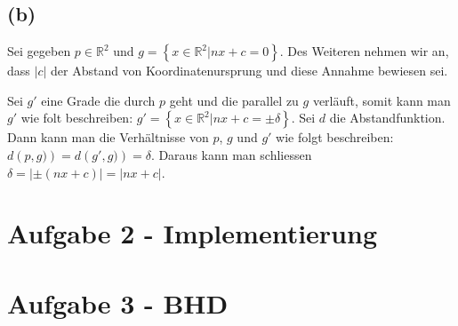 \documentclass[a4paper]{article}
\begin{document}
\subsection*{(b)}

Sei gegeben $p \in \mathbb{R}^2$ und $g = \left\{x \in \mathbb{R}^2| nx + c = 0 \right\}$. Des Weiteren nehmen wir an, dass $|c|$ der Abstand von Koordinatenursprung und diese Annahme bewiesen sei.

Sei $g'$ eine Grade die durch $p$ geht und die parallel zu $g$ verläuft, somit kann man $g'$ wie folt beschreiben: $g' = \left\{x \in \mathbb{R}^2| nx + c = \pm \delta \right\}$. Sei $d$ die Abstandfunktion. Dann kann man die Verhältnisse von $p$, $g$ und $g'$ wie folgt beschreiben: $d\left(p,g)\right) = d\left(g',g)\right) = \delta$. Daraus kann man schliessen $\delta = | \pm \left(nx+c\right)| = |nx+c|$.

\section*{Aufgabe 2 - Implementierung}

\section*{Aufgabe 3 - BHD}
\end{document}
